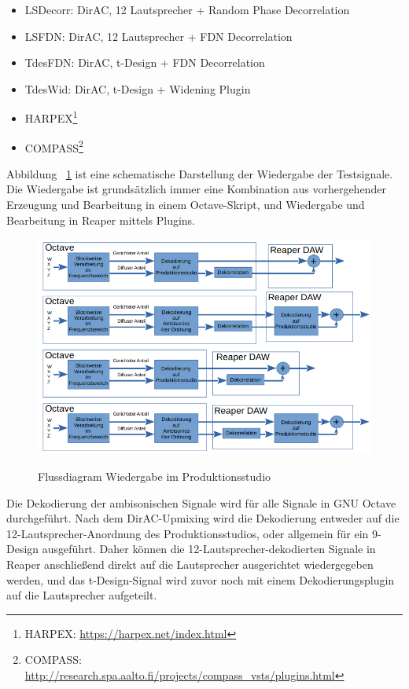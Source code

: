 \begin{itemize}
	\item LSDecorr: DirAC, 12 Lautsprecher + Random Phase Decorrelation
	\item LSFDN: DirAC, 12 Lautsprecher + FDN Decorrelation
	\item TdesFDN: DirAC, t-Design + FDN Decorrelation
	\item TdesWid: DirAC, t-Design + Widening Plugin
	\item HARPEX\footnote{HARPEX: \url{https://harpex.net/index.html}}
	\item COMPASS\footnote{COMPASS: \url{http://research.spa.aalto.fi/projects/compass_vsts/plugins.html}}
\end{itemize}




Abbildung ~\ref{fig:algos} ist eine schematische Darstellung der Wiedergabe der Testsignale. Die Wiedergabe ist grundsätzlich immer eine Kombination aus vorhergehender Erzeugung und Bearbeitung in einem Octave-Skript, und Wiedergabe und Bearbeitung in Reaper mittels Plugins.

\begin{figure}[!ht]
  \centering
  \includegraphics[width=1\textwidth]{aufbau/plots/algos.png}
  \label{fig:algos}
  \caption{Flussdiagram Wiedergabe im Produktionsstudio}
\end{figure}

Die Dekodierung der ambisonischen Signale wird für alle Signale in GNU Octave durchgeführt. Nach dem DirAC-Upmixing wird die Dekodierung entweder auf die 12-Lautsprecher-Anordnung des Produktionsstudios, oder allgemein für ein 9-Design ausgeführt. Daher können die 12-Lautsprecher-dekodierten Signale in Reaper anschließend direkt auf die Lautsprecher ausgerichtet wiedergegeben werden, und das t-Design-Signal wird zuvor noch mit einem Dekodierungsplugin auf die Lautsprecher aufgeteilt.

